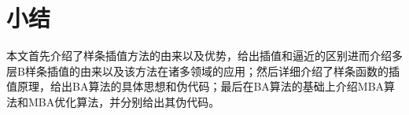 \section{小结}
本文首先介绍了样条插值方法的由来以及优势，给出插值和逼近的区别进而介绍多层B样条插值的由来以及该方法在诸多领域的应用；然后详细介绍了样条函数的插值原理，给出BA算法的具体思想和伪代码；最后在BA算法的基础上介绍MBA算法和MBA优化算法，并分别给出其伪代码。